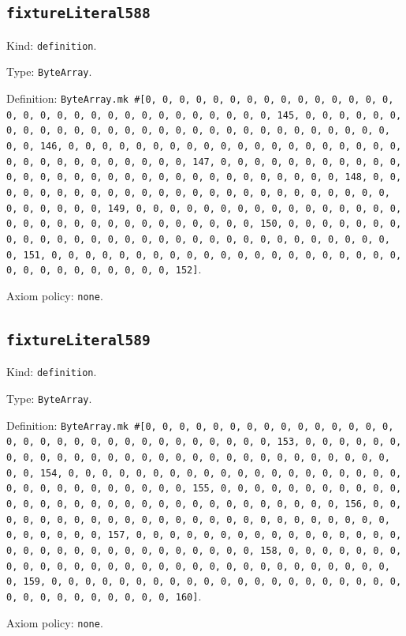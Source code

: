 \documentclass[11pt]{article}
\begin{document}
\subsection*{\texttt{fixtureLiteral588}}
\noindent Kind: \texttt{definition}.\par
\noindent Type: \texttt{ByteArray}.\par
\noindent Definition: \texttt{ByteArray.mk \#[0, 0, 0, 0, 0, 0, 0, 0, 0, 0, 0, 0, 0, 0, 0, 0, 0, 0, 0, 0, 0, 0, 0, 0, 0, 0, 0, 0, 0, 0, 0, 145, 0, 0, 0, 0, 0, 0, 0, 0, 0, 0, 0, 0, 0, 0, 0, 0, 0, 0, 0, 0, 0, 0, 0, 0, 0, 0, 0, 0, 0, 0, 0, 146, 0, 0, 0, 0, 0, 0, 0, 0, 0, 0, 0, 0, 0, 0, 0, 0, 0, 0, 0, 0, 0, 0, 0, 0, 0, 0, 0, 0, 0, 0, 0, 147, 0, 0, 0, 0, 0, 0, 0, 0, 0, 0, 0, 0, 0, 0, 0, 0, 0, 0, 0, 0, 0, 0, 0, 0, 0, 0, 0, 0, 0, 0, 0, 148, 0, 0, 0, 0, 0, 0, 0, 0, 0, 0, 0, 0, 0, 0, 0, 0, 0, 0, 0, 0, 0, 0, 0, 0, 0, 0, 0, 0, 0, 0, 0, 149, 0, 0, 0, 0, 0, 0, 0, 0, 0, 0, 0, 0, 0, 0, 0, 0, 0, 0, 0, 0, 0, 0, 0, 0, 0, 0, 0, 0, 0, 0, 0, 150, 0, 0, 0, 0, 0, 0, 0, 0, 0, 0, 0, 0, 0, 0, 0, 0, 0, 0, 0, 0, 0, 0, 0, 0, 0, 0, 0, 0, 0, 0, 0, 151, 0, 0, 0, 0, 0, 0, 0, 0, 0, 0, 0, 0, 0, 0, 0, 0, 0, 0, 0, 0, 0, 0, 0, 0, 0, 0, 0, 0, 0, 0, 0, 152]}.\par
\noindent Axiom policy: \texttt{none}.\par
\subsection*{\texttt{fixtureLiteral589}}
\noindent Kind: \texttt{definition}.\par
\noindent Type: \texttt{ByteArray}.\par
\noindent Definition: \texttt{ByteArray.mk \#[0, 0, 0, 0, 0, 0, 0, 0, 0, 0, 0, 0, 0, 0, 0, 0, 0, 0, 0, 0, 0, 0, 0, 0, 0, 0, 0, 0, 0, 0, 0, 153, 0, 0, 0, 0, 0, 0, 0, 0, 0, 0, 0, 0, 0, 0, 0, 0, 0, 0, 0, 0, 0, 0, 0, 0, 0, 0, 0, 0, 0, 0, 0, 154, 0, 0, 0, 0, 0, 0, 0, 0, 0, 0, 0, 0, 0, 0, 0, 0, 0, 0, 0, 0, 0, 0, 0, 0, 0, 0, 0, 0, 0, 0, 0, 155, 0, 0, 0, 0, 0, 0, 0, 0, 0, 0, 0, 0, 0, 0, 0, 0, 0, 0, 0, 0, 0, 0, 0, 0, 0, 0, 0, 0, 0, 0, 0, 156, 0, 0, 0, 0, 0, 0, 0, 0, 0, 0, 0, 0, 0, 0, 0, 0, 0, 0, 0, 0, 0, 0, 0, 0, 0, 0, 0, 0, 0, 0, 0, 157, 0, 0, 0, 0, 0, 0, 0, 0, 0, 0, 0, 0, 0, 0, 0, 0, 0, 0, 0, 0, 0, 0, 0, 0, 0, 0, 0, 0, 0, 0, 0, 158, 0, 0, 0, 0, 0, 0, 0, 0, 0, 0, 0, 0, 0, 0, 0, 0, 0, 0, 0, 0, 0, 0, 0, 0, 0, 0, 0, 0, 0, 0, 0, 159, 0, 0, 0, 0, 0, 0, 0, 0, 0, 0, 0, 0, 0, 0, 0, 0, 0, 0, 0, 0, 0, 0, 0, 0, 0, 0, 0, 0, 0, 0, 0, 160]}.\par
\noindent Axiom policy: \texttt{none}.\par
\end{document}
